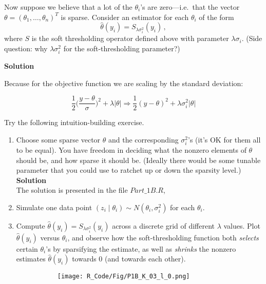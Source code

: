 \documentclass[11 pt]{article}
\begin{document}
\begin{enumerate}[label=(\Alph*)]
Now suppose we believe that a lot of the $\theta_i$'s are zero---i.e.~that the vector $\theta = (\theta_1, \ldots, \theta_n)^T$ is sparse.  Consider an estimator for each $\theta_i$ of the form
$$
\widehat{\theta}(y_i) = S_{\lambda \sigma_i^2}(y_i) \, ,
$$
where $S$ is the soft thresholding operator defined above with parameter $\lambda \sigma_i$.  (Side question: why $\lambda \sigma_i^2$ for the soft-thresholding parameter?)

\textbf{Solution}

Because for the objective function we are scaling by the standard deviation:

$$\frac{1}{2}\bigg(\frac{y - \theta}{\sigma}\bigg)^2 + \lambda | \theta | \Rightarrow \frac{1}{2}(y - \theta)^2 + \lambda \sigma_i^2 | \theta | $$

\vspace{10mm}
Try the following intuition-building exercise.
\begin{enumerate}[label=\arabic*.]
	\item Choose some sparse vector $\theta$ and the corresponding $\sigma_i^2$'s (it's OK for them all to be equal).  You have freedom in deciding what the nonzero elements of $\theta$ should be, and how sparse it should be.  (Ideally there would be some tunable parameter that you could use to ratchet up or down the sparsity level.)\\
	\textbf{Solution}\\
	The solution is presented in the file $Part\_1B.R$,
	
	\item Simulate one data point $(z_i \mid \theta_i) \sim N(\theta_i, \sigma^2_i)$ for each $\theta_i$.
	
	\item Compute $\widehat{\theta}(y_i) = S_{\lambda \sigma_i^2}(y_i)$ across a discrete grid of different $\lambda$ values.  Plot $\widehat{\theta}(y_i)$ versus $\theta_i$, and observe how the soft-thresholding function both \emph{selects} certain $\theta_i$'s by sparsifying the estimate, as well as \emph{shrinks} the nonzero estimates $\widehat{\theta}(y_i)$ towards 0 (and towards each other).
	
	\begin{figure}[H]
		\begin{center}
			\begin{subfigure}[h]{0.3\linewidth}
				\texttt{[image: R\_Code/Fig/P1B\_K\_03\_l\_0.png]}

\end{subfigure}
\end{center}
\end{figure}
\end{enumerate}
\end{enumerate}
\end{document}
